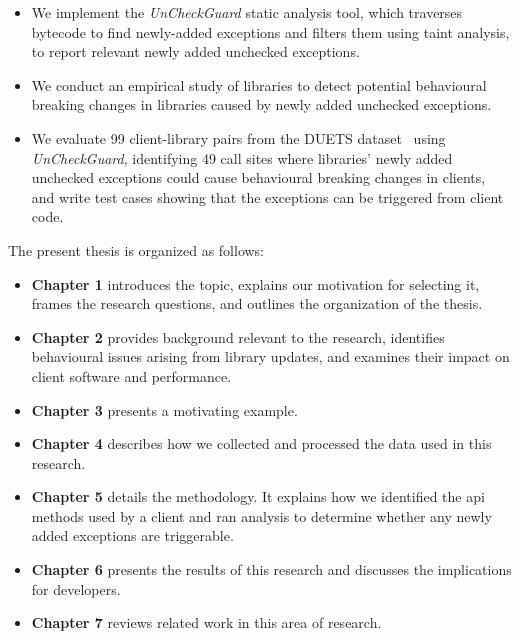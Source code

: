 \begin{itemize}
    \item We implement the \textit{UnCheckGuard} static analysis tool, which traverses bytecode to find newly-added exceptions and filters them using taint analysis, to report relevant newly added unchecked exceptions.
    \item We conduct an empirical study of libraries to detect potential behavioural breaking changes in libraries caused by newly added unchecked exceptions.
    \item We evaluate 99 client-library pairs from the DUETS dataset~\cite{durieux21:_duets} using \textit{UnCheckGuard}, identifying 49 call sites where libraries' newly added unchecked exceptions could cause behavioural breaking changes in clients, and write test cases showing that the exceptions can be triggered from client code.
\end{itemize}

The present thesis is organized as follows:
\begin{itemize}
    \item \textbf{Chapter 1} introduces the topic, explains our motivation for selecting it, frames the research questions, and outlines the organization of the thesis.
    \item \textbf{Chapter 2} provides background relevant to the research, identifies behavioural issues arising from library updates, and examines their impact on client software and performance.
    \item \textbf{Chapter 3} presents a motivating example.
    \item \textbf{Chapter 4} describes how we collected and processed the data used in this research.
    \item \textbf{Chapter 5} details the methodology. It explains how we identified the \gls{api} methods used by a client and ran analysis to determine whether any newly added exceptions are triggerable.
    \item \textbf{Chapter 6} presents the results of this research and discusses the implications for developers.
    \item \textbf{Chapter 7} reviews related work in this area of research.
\end{itemize}
